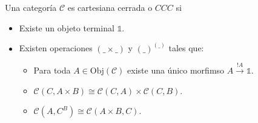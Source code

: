 \documentclass{article}
\begin{document}
\begin{definition}
   Una categoría $\mathcal{C}$ es cartesiana cerrada o $CCC$ si
   \begin{itemize}
    \item Existe un objeto terminal $\mathbb{1}$.
    \item Existen operaciones $(\_\times\_)$ y $(\_)^{(\_)}$ tales que:
    \begin{itemize}
        \item Para toda $A \in \mathrm{Obj}(\mathcal{C})$ existe una único 
              morfimso $A \xrightarrow{!A} \mathbb{1}$.
        \item $\mathcal{C}(C, A \times B) \cong \mathcal{C}(C, A) \times \mathcal{C}(C, B)$.
        \item $\mathcal{C}(A, C^{B}) \cong \mathcal{C}(A \times B, C)$.
    \end{itemize}
   \end{itemize}
\end{definition}
\end{document}
